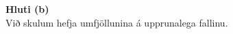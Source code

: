 \documentclass[12pt, a4paper]{article}
\begin{document}
\newpage
\noindent
\textbf{Hluti (b)} \medskip \\
Við skulum hefja umfjöllunina á upprunalega fallinu.

\end{document}
